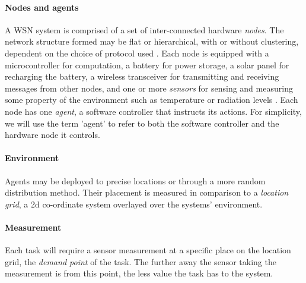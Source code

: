 \paragraph{Nodes and agents}
A WSN system is comprised of a set of inter-connected hardware \textit{nodes}. The network structure formed may be flat or hierarchical, with or without clustering, dependent on the choice of protocol used \citep{Carlos-Mancilla2016b}. Each node is equipped with a microcontroller for computation, a battery for power storage, a solar panel for recharging the battery, a wireless transceiver for  transmitting and receiving messages from other nodes, and one or more \textit{sensors} for sensing and measuring some property of the environment such as temperature or radiation levels \citep{muhammad_r_ahmed_2012_1072589}. Each node has one \textit{agent}, a software controller that instructs its actions. For simplicity, we will use the term 'agent' to refer to both the software controller and the hardware node it controls.

\paragraph{Environment}
Agents may be deployed to precise locations or through a more random distribution method. Their placement is measured in comparison to a \textit{location grid}, a 2d co-ordinate system overlayed over the systems' environment. 

\paragraph{Measurement}
Each task will require a sensor measurement at a specific place on the location grid, the \textit{demand point} of the task. The further away the sensor taking the measurement is from this point, the less value the task has to the system.

